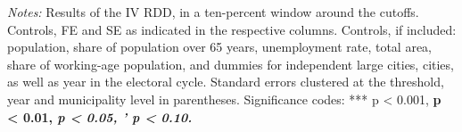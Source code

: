 \begin{table}[htbp]
   \par \raggedright 
   \footnotesize{\textit{Notes:} Results of the \ac{IV} \ac{RDD}, in a ten-percent window around the cutoffs. Controls, \ac{FE} and \ac{SE} as indicated in the respective columns. Controls, if included: population, share of population over 65 years, unemployment rate, total area, share of working-age population, and dummies for independent large cities, cities, as well as year in the electoral cycle. Standard errors clustered at the threshold, year and municipality level in parentheses. Significance codes: *** p < 0.001, \textbf{ p < 0.01, \textit{ p < 0.05, ' p < 0.10.}}}
\end{table}


